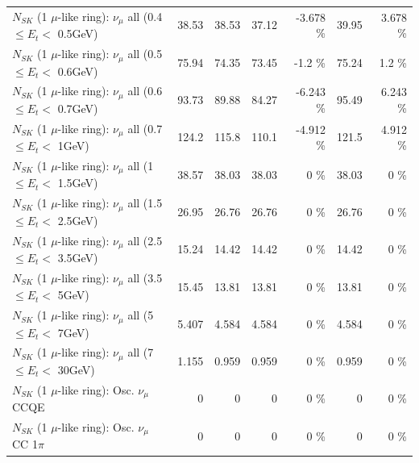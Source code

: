 \begin{table}
\begin{tabular}{| l | r | r | r  r | r  r |}
       $N_{SK}$ (1 $\mu$-like ring): $\nu_{\mu}$ all (0.4 $\leq E_{t} <$ 0.5GeV) &           38.53 &           38.53 &           37.12 &   -3.678 \%  &           39.95 &    3.678 \%  \\ 
       $N_{SK}$ (1 $\mu$-like ring): $\nu_{\mu}$ all (0.5 $\leq E_{t} <$ 0.6GeV) &           75.94 &           74.35 &           73.45 &     -1.2 \%  &           75.24 &      1.2 \%  \\ 
       $N_{SK}$ (1 $\mu$-like ring): $\nu_{\mu}$ all (0.6 $\leq E_{t} <$ 0.7GeV) &           93.73 &           89.88 &           84.27 &   -6.243 \%  &           95.49 &    6.243 \%  \\ 
         $N_{SK}$ (1 $\mu$-like ring): $\nu_{\mu}$ all (0.7 $\leq E_{t} <$ 1GeV) &           124.2 &           115.8 &           110.1 &   -4.912 \%  &           121.5 &    4.912 \%  \\ 
         $N_{SK}$ (1 $\mu$-like ring): $\nu_{\mu}$ all (1 $\leq E_{t} <$ 1.5GeV) &           38.57 &           38.03 &           38.03 &        0 \%  &           38.03 &        0 \%  \\ 
       $N_{SK}$ (1 $\mu$-like ring): $\nu_{\mu}$ all (1.5 $\leq E_{t} <$ 2.5GeV) &           26.95 &           26.76 &           26.76 &        0 \%  &           26.76 &        0 \%  \\ 
       $N_{SK}$ (1 $\mu$-like ring): $\nu_{\mu}$ all (2.5 $\leq E_{t} <$ 3.5GeV) &           15.24 &           14.42 &           14.42 &        0 \%  &           14.42 &        0 \%  \\ 
         $N_{SK}$ (1 $\mu$-like ring): $\nu_{\mu}$ all (3.5 $\leq E_{t} <$ 5GeV) &           15.45 &           13.81 &           13.81 &        0 \%  &           13.81 &        0 \%  \\ 
           $N_{SK}$ (1 $\mu$-like ring): $\nu_{\mu}$ all (5 $\leq E_{t} <$ 7GeV) &           5.407 &           4.584 &           4.584 &        0 \%  &           4.584 &        0 \%  \\ 
          $N_{SK}$ (1 $\mu$-like ring): $\nu_{\mu}$ all (7 $\leq E_{t} <$ 30GeV) &           1.155 &           0.959 &           0.959 &        0 \%  &           0.959 &        0 \%  \\ 
\hline
\hline
                               $N_{SK}$ (1 $\mu$-like ring): Osc. $\nu_\mu$ CCQE &               0 &               0 &               0 &        0 \%  &               0 &        0 \%  \\ 
                          $N_{SK}$ (1 $\mu$-like ring): Osc. $\nu_\mu$ CC 1$\pi$ &               0 &               0 &               0 &        0 \%  &               0 &        0 \%  \\ 

\end{tabular}
\end{table}
